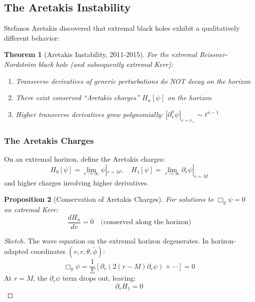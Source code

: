 \documentclass[12pt,a4paper]{article}
\newtheorem{theorem}{Theorem}[section]
\newtheorem{proposition}[theorem]{Proposition}
\begin{document}
\subsection{The Aretakis Instability}

Stefanos Aretakis discovered that extremal black holes exhibit a qualitatively different behavior:

\begin{theorem}[Aretakis Instability, 2011-2015]
For the extremal Reissner-Nordström black hole (and subsequently extremal Kerr):
\begin{enumerate}
    \item Transverse derivatives of generic perturbations do NOT decay on the horizon
    \item There exist conserved ``Aretakis charges'' $H_n[\psi]$ on the horizon
    \item Higher transverse derivatives grow polynomially: $|\partial_r^n \psi|_{r=r_+} \sim t^{n-1}$
\end{enumerate}
\end{theorem}

\subsubsection{The Aretakis Charges}

On an extremal horizon, define the Aretakis charges:
\begin{equation}
H_0[\psi] = \lim_{v \to \infty} \psi|_{r=M}, \quad H_1[\psi] = \lim_{v \to \infty} \partial_r\psi|_{r=M}
\end{equation}
and higher charges involving higher derivatives.

\begin{proposition}[Conservation of Aretakis Charges]
For solutions to $\Box_g \psi = 0$ on extremal Kerr:
\begin{equation}
\frac{d H_n}{dv} = 0 \quad \text{(conserved along the horizon)}
\end{equation}
\end{proposition}

\begin{proof}[Sketch]
The wave equation on the extremal horizon degenerates. In horizon-adapted coordinates $(v, r, \theta, \tilde{\phi})$:
\begin{equation}
\Box_g \psi = \frac{1}{\Sigma}\left[\partial_v(2(r-M)\partial_r\psi) + \cdots\right] = 0
\end{equation}
At $r = M$, the $\partial_r\psi$ term drops out, leaving:
\begin{equation}
\partial_v H_1 = 0
\end{equation}
\end{proof}
\end{document}
